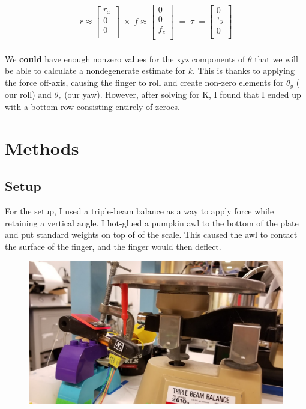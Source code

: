 \documentclass[preprint,12pt,3p]{elsarticle}
\begin{document}
\begin{align}
r \approx
\begin{bmatrix}
    r_x       \\
    0       \\
    0       \\
\end{bmatrix} \; \times \;
f \approx
\begin{bmatrix}
    0       \\
    0       \\
    f_z      \\
\end{bmatrix} \; =  \; \tau \; = 
\begin{bmatrix}
    0 \\
    \tau_y       \\
    0      \\
\end{bmatrix}\\
\end{align}

We \textbf{could} have enough nonzero values for the xyz components of $\theta$ that we will be able
to calculate a nondegenerate estimate for $k$. This is thanks to applying the force off-axis,
causing the finger to roll and create non-zero elements for $\theta_y$ ( our roll) and $\theta_z$
(our yaw). However, after solving for K, I found that I ended up with a bottom row consisting
entirely of zeroes.


\section{Methods}

\subsection{Setup}

For the setup, I used a triple-beam balance as a way to apply force while retaining a vertical
angle. I hot-glued a pumpkin awl to the bottom of the plate and put standard weights on top of of
the scale. This caused the awl to contact the surface of the finger, and the finger would then
deflect. 

\begin{figure}[H]
\centering
\includegraphics[width=.5\textheight]{images/setup/closeup.jpg}
\end{figure}
\end{document}
